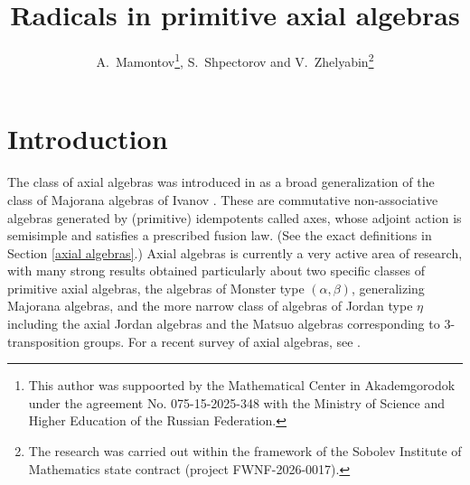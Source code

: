 \documentclass[12pt]{article}
\title{Radicals in primitive axial algebras}
\author{
A.~Mamontov\footnote{This author was suppoorted by the Mathematical Center in Akademgorodok under the agreement No. 075-15-2025-348 with the Ministry of Science and Higher Education of the Russian Federation.}, 
S.~Shpectorov and 
V.~Zhelyabin\footnote{The research was carried out within
the framework of the Sobolev Institute of Mathematics
state contract (project FWNF-2026-0017).}}
\newcommand\al{\alpha}
\newcommand\bt{\beta}
\begin{document}
\maketitle

\newcommand{\Addresses}{{%
		\bigskip\noindent
		\footnotesize
        Andrey~Mamontov, \textsc{Sobolev Institute of Mathematics, Novosibirsk, Russia;}\\\nopagebreak
		\textit{E-mail address: } \texttt{mamontov@math.nsc.ru}
		\\\nopagebreak	
        ORCID:\textsc{0000-0002-0324-5287}
        
        \medskip\noindent
        Sergey~Shpectorov, \textsc{School of Mathematics, University of Birmingham, Birmingham, UK;}\\\nopagebreak
        \textit{E-mail address: } 
        \texttt{s.shpectorov@bham.ac.uk}
        \\\nopagebreak
        ORCID:\textsc{0000-0001-6202-5885}
		
		\medskip\noindent
        Victor~Zhelyabin, \textsc{Sobolev Institute of Mathematics, Novosibirsk, Russia;}\\\nopagebreak
		\textit{E-mail address: } \texttt{vicnic@math.nsc.ru}
		\\\nopagebreak
		ORCID:\textsc{0000-0001-9371-6363}
        	
		\medskip
}}

\section{Introduction}

The class of axial algebras was introduced in \cite{hrs,hrs1} as a broad 
generalization of the class of Majorana algebras of Ivanov \cite{i}. These are 
commutative non-associative algebras generated by (primitive) idempotents called axes, 
whose adjoint action is semisimple and satisfies a prescribed fusion law. (See the 
exact definitions in Section \ref{axial algebras}.) Axial algebras is currently a 
very active area of research, with many strong results obtained particularly about 
two specific classes of primitive axial algebras, the algebras of Monster type 
$(\al,\bt)$, generalizing Majorana algebras, and the more narrow class of algebras of 
Jordan type $\eta$ including the axial Jordan algebras and the Matsuo algebras 
corresponding to $3$-transposition groups. For a recent survey of axial algebras, see 
\cite{ms}. 
\end{document}
